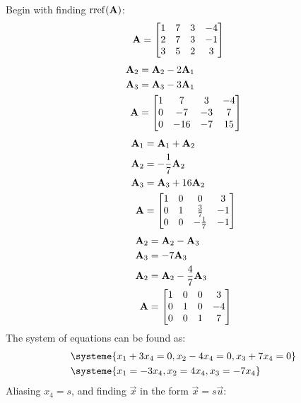\documentclass{article}
\DeclareMathOperator{\rref}{rref}
\begin{document}
Begin with finding $ \rref(\matr{A}) $:
\begin{align*}
	\mathbf{A} & =
		\begin{bmatrix}
			1 & 7 & 3 & -4 \\
			2 & 7 & 3 & -1 \\
			3 & 5 & 2 & 3
		\end{bmatrix}
\end{align*}
\begin{align*}
	\mathbf{A}_2 & = \mathbf{A}_2 - 2\mathbf{A}_1 \\
	\mathbf{A}_3 & = \mathbf{A}_3 - 3\mathbf{A}_1 \\
	\mathbf{A} & =
		\begin{bmatrix}
			1 & 7 & 3 & -4 \\
			0 & -7 & -3 & 7 \\
			0 & -16 & -7 & 15
		\end{bmatrix}
\end{align*}
\begin{align*}
	\mathbf{A}_1 & = \mathbf{A}_1 + \mathbf{A}_2 \\
	\mathbf{A}_2 & = -\frac{1}{7}\mathbf{A}_2 \\
	\mathbf{A}_3 & = \mathbf{A}_3 + 16\mathbf{A}_2 \\
	\mathbf{A} & =
		\begin{bmatrix}
			1 & 0 & 0 & 3 \\
			0 & 1 & \frac{3}{7} & -1 \\
			0 & 0 & -\frac{1}{7} & -1
		\end{bmatrix}
\end{align*}
\begin{align*}
	\mathbf{A}_2 & = \mathbf{A}_2 - \mathbf{A}_3 \\
	\mathbf{A}_3 & = -7\mathbf{A}_3 \\
	\mathbf{A}_2 & = \mathbf{A}_2 - \frac{4}{7}\mathbf{A}_3 \\
	\mathbf{A} & =
		\begin{bmatrix}
			1 & 0 & 0 & 3 \\
			0 & 1 & 0 & -4 \\
			0 & 0 & 1 & 7
		\end{bmatrix}
\end{align*}
The system of equations can be found as:
\begin{align*}
	& \systeme{
		x_1 + 3x_4 = 0,
		x_2 - 4x_4 = 0,
		x_3 + 7x_4 = 0
	} \\
	& \systeme{
		x_1 = -3x_4,
		x_2 = 4x_4,
		x_3 = -7x_4
	}
\end{align*}
Aliasing $ x_4 = s $, and finding $ \vec{x} $ in the form $ \vec{x} = s\vec{u} $:
\end{document}

